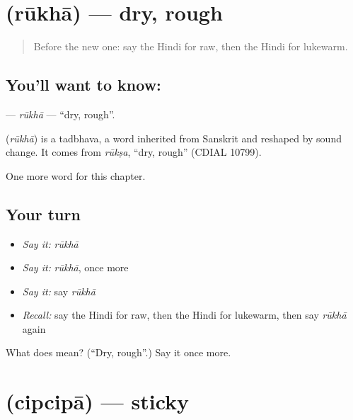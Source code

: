\section[\texorpdfstring{\hi{रूखा} (rūkhā)}{रूखा (rūkhā)}]{ (rūkhā) — dry, rough}

\label{lesson:HI-C238-rukha}



\begin{quote}
Before the new one: say the Hindi for raw, then the Hindi for lukewarm.
\end{quote}

\subsection*{You'll want to know: }
\textbf{} — \emph{rūkhā} — \textquotedblleft{}dry, rough\textquotedblright{}.

\begin{cousinweb}
\textbf{} (\emph{rūkhā}) is a tadbhava, a word inherited from Sanskrit and reshaped by sound change. It comes from \emph{rūkṣa}, \textquotedblleft{}dry, rough\textquotedblright{} (CDIAL 10799).
\end{cousinweb}

\begin{grammarlens}[title={What you've built}]
One more word for this chapter.
\end{grammarlens}

\subsection*{Your turn}
\begin{itemize}
\raggedright
  \item \emph{Say it:} \emph{rūkhā}
  \item \emph{Say it:} \emph{rūkhā}, once more
  \item \emph{Say it:} say \emph{rūkhā}
  \item \emph{Recall:} say the Hindi for raw, then the Hindi for lukewarm, then say \emph{rūkhā} again
\end{itemize}

\begin{tcolorbox}[breakable,colback=teal!4,colframe=teal!35!black,title={Before you move on}]
What does  mean? (\textquotedblleft{}Dry, rough\textquotedblright{}.) Say it once more.
\end{tcolorbox}
\section[\texorpdfstring{\hi{चिपचिपा} (cipcipā)}{चिपचिपा (cipcipā)}]{ (cipcipā) — sticky}

